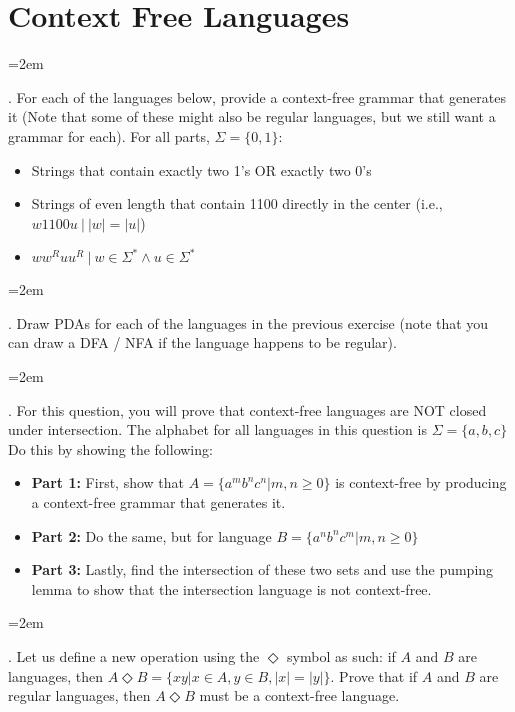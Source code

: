 \documentclass[12pt]{article}
\def\homework{Context Free Languages}
\newcounter{quesnum}
\newcommand{\question}[2][??]{
\begin{list}{\labelitemi}{\leftmargin=2em}
\item [\arabic{quesnum}.] {} {#2}
\end{list}
\addtocounter{quesnum}{1}
}
\begin{document}
\section*{\homework}


\question[3]{
For each of the languages below, provide a context-free grammar that generates it (Note that some of these might also be regular languages, but we still want a grammar for each). For all parts, $\Sigma=\{0,1\}$:
}

\begin{itemize}
	\item Strings that contain exactly two 1's OR exactly two 0's
	\item Strings of even length that contain 1100 directly in the center (i.e., $w1100u \ | \ |w|=|u|$)
	\item $ww^Ruu^R \ | \ w \in \Sigma^* \wedge u \in \Sigma^*$
\end{itemize}

\vspace{12pt}

\question[3]{
Draw PDAs for each of the languages in the previous exercise (note that you can draw a DFA / NFA if the language happens to be regular).
}

\vspace{12pt}

\question[3]{
For this question, you will prove that context-free languages are NOT closed under intersection. The alphabet for all languages in this question is $\Sigma = \{a,b,c\}$ Do this by showing the following:
}

\begin{itemize}
	\item \textbf{Part 1:} First, show that $A=\{a^mb^nc^n | m,n \geq 0\}$ is context-free by producing a context-free grammar that generates it.
	\item \textbf{Part 2:} Do the same, but for language $B=\{a^nb^nc^m | m,n \geq 0\}$
	\item \textbf{Part 3:} Lastly, find the intersection of these two sets and use the pumping lemma to show that the intersection language is not context-free.
\end{itemize}

\vspace{12pt}



\question[3]{
Let us define a new operation using the $\Diamond$ symbol as such: if $A$ and $B$ are languages, then $A \Diamond B = \{xy | x \in A, y \in B, |x|=|y| \}$. Prove that if $A$ and $B$ are regular languages, then $A \Diamond B$ must be a context-free language.
}
\end{document}

